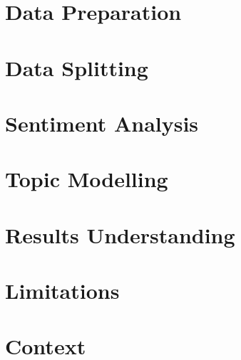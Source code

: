 \documentclass{article}
\begin{document}
  \tableofcontents
  \thispagestyle{empty}
  \pagebreak
  \setcounter{page}{1}
  \setcounter{section}{0}
  \section{Data Preparation}
  \section{Data Splitting}
  \section{Sentiment Analysis}
  \section{Topic Modelling}
  \section{Results Understanding}
  \section{Limitations}
  \section{Context}
\end{document}
